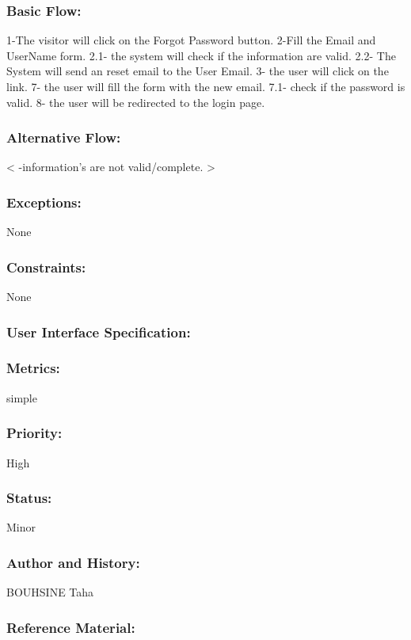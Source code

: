 \documentclass[11pt, openany]{report}
\begin{document}
\subsubsection{Basic Flow:}
1-The visitor will click on the Forgot Password button.
2-Fill the Email and UserName form.
  2.1- the system will check if the information are valid.
  2.2- The System will send an reset email to the User Email.
3- the user will click on the link.
7- the user will fill the form with the new email.
  7.1- check if the password is valid.
8- the user will be redirected to the login page.
\subsubsection{Alternative Flow:}
< -information's are not valid/complete. >
\subsubsection{Exceptions:}
None
\subsubsection{Constraints:}
None
\subsubsection{User Interface Specification:}
\subsubsection{Metrics:}
simple
\subsubsection{Priority:}
High
\subsubsection{Status:}
Minor
\subsubsection{Author and History:}
BOUHSINE Taha
\subsubsection{Reference Material:}
\end{document}
